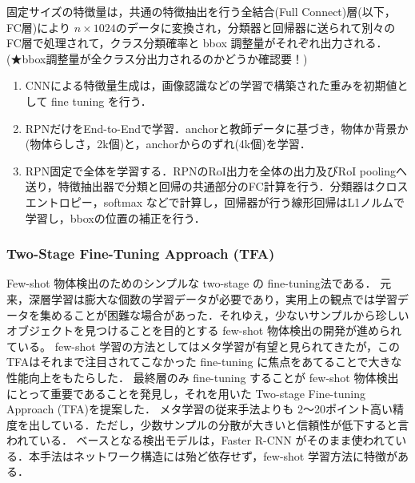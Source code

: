 \documentclass[originalpaper,fleqn]{jsaiart}     %
\begin{document}
固定サイズの特徴量は，共通の特徴抽出を行う全結合(Full Connect)層(以下，FC層)により $n{\times}1024$のデータに変換され，分類器と回帰器に送られて別々のFC層で処理されて，クラス分類確率と bbox 調整量がそれぞれ出力される．(★bbox調整量が全クラス分出力されるのかどうか確認要！)

\begin{enumerate}
    \item CNNによる特徴量生成は，画像認識などの学習で構築された重みを初期値として fine tuning を行う．
    \item RPNだけをEnd-to-Endで学習．anchorと教師データに基づき，物体か背景か(物体らしさ，2k個)と，anchorからのずれ(4k個)を学習．
    \item RPN固定で全体を学習する．RPNのRoI出力を全体の出力及びRoI poolingへ送り，特徴抽出器で分類と回帰の共通部分のFC計算を行う．分類器はクロスエントロピー，softmax などで計算し，回帰器が行う線形回帰はL1ノルムで学習し，bboxの位置の補正を行う．
\end{enumerate}

\subsubsection{Two-Stage Fine-Tuning Approach (TFA)}
Few-shot 物体検出のためのシンプルな two-stage の fine-tuning法である\cite{WHGDY20}．
元来，深層学習は膨大な個数の学習データが必要であり，実用上の観点では学習データを集めることが困難な場合があった．それゆえ，少ないサンプルから珍しいオブジェクトを見つけることを目的とする few-shot 物体検出の開発が進められている。
few-shot 学習の方法としてはメタ学習が有望と見られてきたが，このTFAはそれまで注目されてこなかった fine-tuning に焦点をあてることで大きな性能向上をもたらした．
最終層のみ fine-tuning することが few-shot 物体検出にとって重要であることを発見し，それを用いた Two-stage Fine-tuning Approach (TFA)を提案した．
メタ学習の従来手法よりも 2〜20ポイント高い精度を出している．ただし，少数サンプルの分散が大きいと信頼性が低下すると言われている．
ベースとなる検出モデルは，Faster R-CNN がそのまま使われている．本手法はネットワーク構造には殆ど依存せず，few-shot 学習方法に特徴がある．
\end{document}
